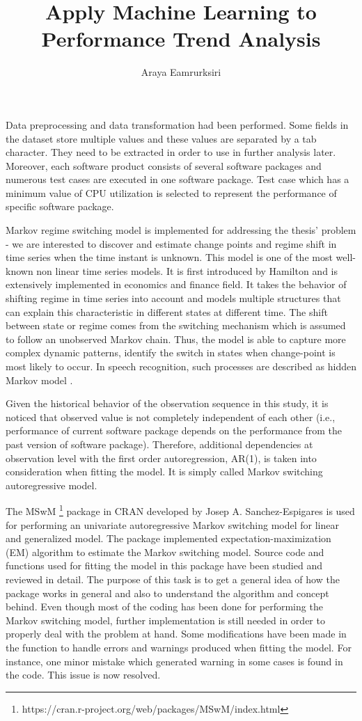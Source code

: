 \documentclass[]{article}
\title{Apply Machine Learning to Performance Trend Analysis}
\author{Araya Eamrurksiri}
\begin{document}
\date{}
\maketitle

Data preprocessing and data transformation had been performed. Some fields in the dataset store multiple values and these values are separated by a tab character. They need to be extracted in order to use in further analysis later. Moreover, each software product consists of several software packages and numerous test cases are executed in one software package. Test case which has a minimum value of CPU utilization is selected to represent the performance of specific software package.

Markov regime switching model is implemented for addressing the thesis' problem - we are interested to discover and estimate change points and regime shift in time series when the time instant is unknown. This model is one of the most well-known non linear time series models. It is first introduced by Hamilton \cite{hamilton1989new} and is extensively implemented in economics and finance field. It takes the behavior of shifting regime in time series into account and models multiple structures that can explain this characteristic in different states at different time. The shift between state or regime comes from the switching mechanism which is assumed to follow an unobserved Markov chain. Thus, the model is able to capture more complex dynamic patterns, identify the switch in states when change-point is most likely to occur. In speech recognition, such processes are described as hidden Markov model \cite{rabiner1989tutorial}. 

Given the historical behavior of the observation sequence in this study, it is noticed that observed value is not completely independent of each other (i.e., performance of current software package depends on the performance from the past version of software package). Therefore, additional dependencies at observation level with the first order autoregression, AR(1), is taken into consideration when fitting the model. It is simply called Markov switching autoregressive model.

The MSwM \footnote{https://cran.r-project.org/web/packages/MSwM/index.html} package in CRAN developed by Josep A. Sanchez-Espigares is used for performing an univariate autoregressive Markov switching model for linear and generalized model. The package implemented expectation-maximization (EM) algorithm to estimate the Markov switching model. Source code and functions used for fitting the model in this package have been studied and reviewed in detail. The purpose of this task is to get a general idea of how the package works in general and also to understand the algorithm and concept behind. Even though most of the coding has been done for performing the Markov switching model, further implementation is still needed in order to properly deal with the problem at hand. Some modifications have been made in the function to handle errors and warnings produced when fitting the model. For instance, one minor mistake which generated warning in some cases is found in the code. This issue is now resolved. 
\end{document}
